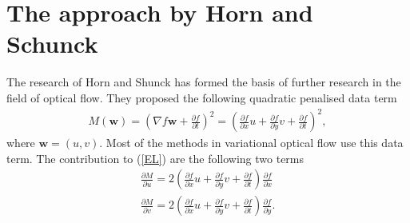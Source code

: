 \documentclass[10pt,a4paper]{article}
\begin{document}
\section{The approach by Horn and Schunck}
The research of Horn and Shunck \cite{HS} has formed the basis of further research in the field of optical flow. They proposed the following quadratic penalised data term
\begin{align}
M(\textbf{w}) = (\nabla f \textbf{w} + \frac{\partial f}{\partial t})^2 = (\frac{\partial f}{\partial x} u + \frac{\partial f}{\partial y} v + \frac{\partial f}{\partial t})^2,
\end{align}
where $\textbf{w} = (u,v)$. Most of the methods in variational optical flow use this data term. The contribution to (\ref{EL}) are the following two terms
\begin{equation}
\begin{aligned}
\frac{\partial M}{\partial u} = 2(\frac{\partial f}{\partial x}u + \frac{\partial f}{\partial y}v + \frac{\partial f}{\partial t}) \frac{\partial f}{\partial x} \\
\frac{\partial M}{\partial v} = 2(\frac{\partial f}{\partial x}u + \frac{\partial f}{\partial y}v + \frac{\partial f}{\partial t}) \frac{\partial f}{\partial y}. \\
\end{aligned}
\end{equation}
\end{document}
